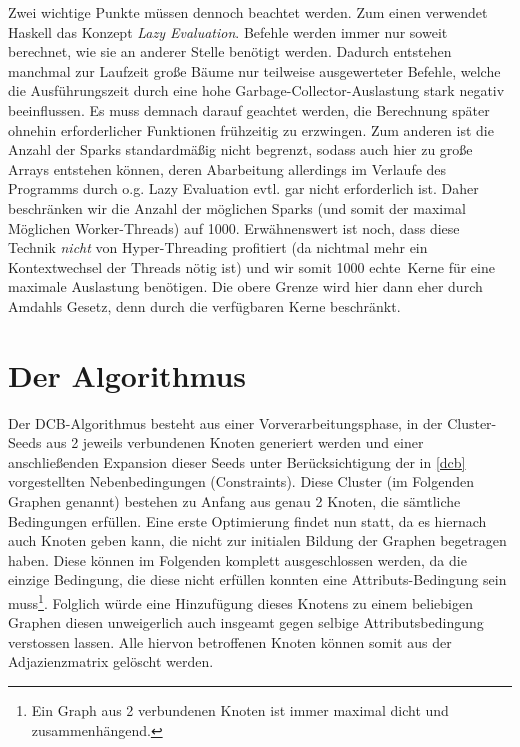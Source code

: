 \documentclass[a4paper]{scrartcl}
\newcommand{\en}[1]{\selectlanguage{USenglish}#1\selectlanguage{ngerman}}
\begin{document}
\medskip
Zwei wichtige Punkte müssen dennoch beachtet werden. Zum einen verwendet Haskell das Konzept \emph{\en{Lazy Evaluation}}. Befehle werden immer nur soweit berechnet, wie sie an anderer Stelle benötigt werden. Dadurch entstehen manchmal zur Laufzeit große Bäume nur teilweise ausgewerteter Befehle, welche die Ausführungszeit durch eine hohe Garbage-Collector-Auslastung stark negativ beeinflussen. Es muss demnach darauf geachtet werden, die Berechnung später ohnehin erforderlicher Funktionen frühzeitig zu erzwingen. Zum anderen ist die Anzahl der Sparks standardmäßig nicht begrenzt, sodass auch hier zu große Arrays entstehen können, deren Abarbeitung allerdings im Verlaufe des Programms durch o.g. Lazy Evaluation evtl. gar nicht erforderlich ist. Daher beschränken wir die Anzahl der möglichen Sparks (und somit der maximal Möglichen Worker-Threads) auf 1000. Erwähnenswert ist noch, dass diese Technik \emph{nicht} von Hyper-Threading profitiert (da nichtmal mehr ein Kontextwechsel der Threads nötig ist) und wir somit 1000 \glqq echte\grqq \ Kerne für eine maximale Auslastung benötigen. Die obere Grenze wird hier dann eher durch Amdahls Gesetz, denn durch die verfügbaren Kerne beschränkt.


\section{Der Algorithmus}

Der DCB-Algorithmus besteht aus einer Vorverarbeitungsphase, in der Cluster-Seeds aus 2 jeweils verbundenen Knoten generiert werden und einer anschließenden Expansion dieser Seeds unter Berücksichtigung der in \ref{dcb} vorgestellten Nebenbedingungen (Constraints). Diese Cluster (im Folgenden Graphen genannt) bestehen zu Anfang aus genau 2 Knoten, die sämtliche Bedingungen erfüllen. Eine erste Optimierung findet nun statt, da es hiernach auch Knoten geben kann, die nicht zur initialen Bildung der Graphen begetragen haben. Diese können im Folgenden komplett ausgeschlossen werden, da die einzige Bedingung, die diese nicht erfüllen konnten eine Attributs-Bedingung sein muss\footnote{Ein Graph aus 2 verbundenen Knoten ist immer maximal dicht und zusammenhängend.}. Folglich würde eine Hinzufügung dieses Knotens zu einem beliebigen Graphen diesen unweigerlich auch insgeamt gegen selbige Attributsbedingung verstossen lassen. Alle hiervon betroffenen Knoten können somit aus der Adjazienzmatrix gelöscht werden.
\end{document}
